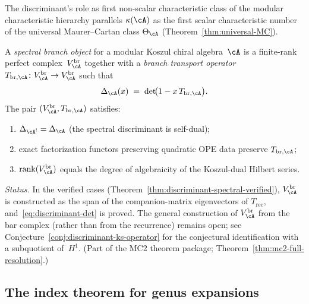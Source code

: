 \begin{remark}
The discriminant's role as first non-scalar characteristic class
of the modular characteristic hierarchy parallels $\kappa(\cA)$ as the first
scalar characteristic number of the universal Maurer--Cartan
class $\Theta_{\cA}$ (Theorem~\ref{thm:universal-MC}).
\end{remark}

\begin{definition}
\label{def:spectral-branch-object}
A \emph{spectral branch object} for a modular Koszul chiral
algebra~$\cA$ is a finite-rank perfect complex~$V_{\cA}^{\mathrm{br}}$
together with a \emph{branch transport operator}
$T_{\mathrm{br},\cA} \colon V_{\cA}^{\mathrm{br}} \to
V_{\cA}^{\mathrm{br}}$ such that
\begin{equation}\label{eq:discriminant-det}
\Delta_{\cA}(x)
\;=\;
\det\!\bigl(1 - x\, T_{\mathrm{br},\cA}\bigr).
\end{equation}
The pair $(V_{\cA}^{\mathrm{br}}, T_{\mathrm{br},\cA})$ satisfies:
\begin{enumerate}[label=\textup{(\roman*)}]
\item $\Delta_{\cA^!} = \Delta_{\cA}$
  (the spectral discriminant is self-dual);
\item exact factorization functors preserving quadratic OPE data
  preserve $T_{\mathrm{br},\cA}$;
\item $\operatorname{rank}(V_{\cA}^{\mathrm{br}})$
  equals the degree of algebraicity of the Koszul-dual
  Hilbert series.
\end{enumerate}

\smallskip\noindent
\emph{Status.}
In the verified cases (Theorem~\ref{thm:discriminant-spectral-verified}),
$V_{\cA}^{\mathrm{br}}$ is constructed as the span of the
companion-matrix eigenvectors of $T_{\mathrm{rec}}$,
and~\eqref{eq:discriminant-det} is proved.  The general
construction of $V_{\cA}^{\mathrm{br}}$ from the bar complex
(rather than from the recurrence) remains open; see
Conjecture~\ref{conj:discriminant-ks-operator} for the
conjectural identification with a subquotient of~$H^1$.
(Part of the MC2 theorem package; Theorem~\ref{thm:mc2-full-resolution}.)
\end{definition}

\subsection{The index theorem for genus expansions}

